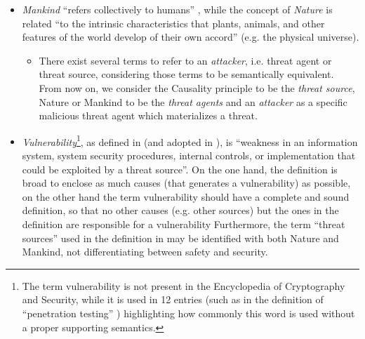 \documentclass[conference]{IEEEtran}
\begin{document}
\begin{itemize}
	\item \emph{Mankind} ``refers collectively to humans''
\autocite{wiki-mankind}, while the concept of \emph{Nature} is
		related ``to the intrinsic characteristics that plants,
		animals, and other features of the world develop of their own
		accord'' (e.g. the physical universe)\autocite{wiki-nature}. 
		\begin{itemize}
			\item There exist several terms to refer to an
				\emph{attacker}, i.e. threat agent or threat source,
				considering those terms to be semantically
				equivalent.  From now on, we consider the
				Causality principle to be the \emph{threat
				source}, Nature or Mankind to be the
				\emph{threat agents} and an \emph{attacker} as
				a specific malicious threat agent which materializes a
				threat.
		\end{itemize}
	\item \emph{Vulnerability}\footnote{The term vulnerability is not
		present in the Encyclopedia of Cryptography and Security, while
		it is used in 12 entries (such as in the definition of
		``penetration testing'' \autocite{caddy2005pentest})
		highlighting how commonly this word is used without a proper
		supporting semantics.}, as defined in \autocite{cnssi20104009}
		(and adopted in \autocite{nist2013800-53}), is ``weakness in an
		information system, system security procedures, internal
		controls, or implementation that could be exploited by a threat
		source''. On the one hand, the definition is broad to enclose
		as much causes (that generates a vulnerability) as possible,
		on the other hand the term vulnerability should have a complete and sound
		definition, so that no other causes (e.g.  other sources) but
		the ones in the definition are responsible for a vulnerability
		Furthermore, the term ``threat sources'' used in the definition
		in\autocite{cnssi20104009} may be identified with both Nature
		and Mankind, not differentiating between safety and security.
\end{itemize}
\end{document}
